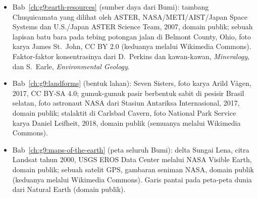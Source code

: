 \begin{itemize}
  \item Bab~\ref{ch:g9:earth-resources} (sumber daya dari Bumi): tambang Chuquicamata yang dilihat oleh ASTER, NASA/\allowbreak METI/\allowbreak AIST/\allowbreak Japan Space Systems dan U.S./\allowbreak Japan ASTER Science Team, 2007, domain publik; sebuah lapisan batu bara pada tebing potongan jalan di Belmont County, Ohio, foto karya James St.~John, CC BY 2.0 (keduanya melalui Wikimedia Commons). Faktor-faktor konsentrasinya dari D.~Perkins dan kawan-kawan, \emph{Mineralogy}, dan S.~Earle, \emph{Environmental Geology}.
  \item Bab~\ref{ch:g9:landforms} (bentuk lahan): Seven Sisters, foto karya Arild Vågen, 2017, CC BY-SA 4.0; gumuk-gumuk pasir berbentuk sabit di pesisir Brasil selatan, foto astronaut NASA dari Stasiun Antariksa Internasional, 2017, domain publik; stalaktit di Carlsbad Cavern, foto National Park Service karya Daniel Leifheit, 2018, domain publik (semuanya melalui Wikimedia Commons).
  \item Bab~\ref{ch:g9:maps-of-the-earth} (peta seluruh Bumi): delta Sungai Lena, citra Landsat tahun 2000, USGS EROS Data Center melalui NASA Visible Earth, domain publik; sebuah satelit GPS, gambaran seniman NASA, domain publik (keduanya melalui Wikimedia Commons). Garis pantai pada peta-peta dunia dari Natural Earth (domain publik).
\end{itemize}

